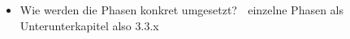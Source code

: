 \begin{itemize}
    \item Wie werden die Phasen konkret umgesetzt?  einzelne Phasen als Unterunterkapitel also 3.3.x
\end{itemize}